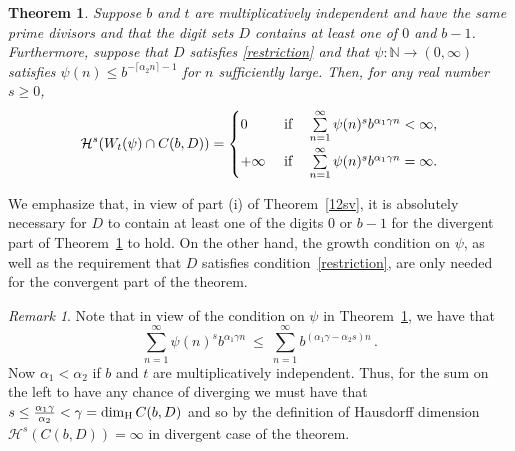 \documentclass[12pt]{article}
\newtheorem{theorem}{Theorem}[section]
\theoremstyle{definition}
\theoremstyle{remark}
\newtheorem{remark}{{Remark}}[section]
\newcommand{\sv}[1]{{\color{blue}   {#1}}}
\begin{document}
\begin{theorem}\label{12}
Suppose $b$ and $t$ are multiplicatively independent and have the same prime divisors and that the  digit sets $D$ contains at least one of $0$ and $b-1$.   Furthermore, suppose that $D$ satisfies 
\eqref{restriction} and that $\psi:\mathbb{N}\to(0,\infty)$  satisfies $\psi(n)\le b^{-\lceil\alpha_{2}n\rceil-1}$  for $n$ sufficiently large.   Then,  for any real number $s\geq0$,
\begin{equation*}
\begin{aligned}
\mathcal{H}^{s}(W_{t}(\psi)\cap C(b,D))=\begin{cases}0 \ &{\rm if}\quad \sum\limits_{n=1}^{\infty} \psi(n)^{s}b^{\alpha_{1}\gamma n}<\infty, \\[2ex]
+ \infty \  &{\rm if}\quad \sum\limits_{n=1}^{\infty}\psi(n)^{s}b^{\alpha_{1}\gamma n}=\infty. \end{cases}
\end{aligned}
\end{equation*}
\end{theorem}


\bigskip 


\noindent We emphasize that, in view of part (i) of Theorem~\ref{12sv}, it is absolutely necessary for $D$
 to contain at least one of the digits $0$ or 
$b-1$ for the divergent part of Theorem~\ref{12} to hold.
On the other hand, the growth condition on $\psi$, as well as the requirement that $D$ satisfies condition~\eqref{restriction}, are only needed for the convergent part of the theorem.


\begin{remark} 
Note that in view of the condition on $\psi$ in Theorem~\ref{12}, we  have that 
$$ \textstyle{
\sum\limits_{n=1}^{\infty}\psi(n)^{s}b^{\alpha_{1}\gamma n}   \ \le \   \sum\limits_{n=1}^{\infty} b^{(\alpha_{1}\gamma - \alpha_2 s)n }  \, . }
$$
Now  $ \alpha_1 < \alpha_2$  if   $b$ and $t$ are multiplicatively independent. Thus,   for the sum on the left to have any chance of diverging we must have that $ s\leq\frac{\alpha_1\gamma}{\alpha_2} < \gamma= \dim_{\rm H} C(b,D)$  and so by the  definition of Hausdorff dimension  $\mathcal{H}^{s}(C(b,D))=\infty$ in divergent case  of the theorem. 
\end{remark}
\end{document}
